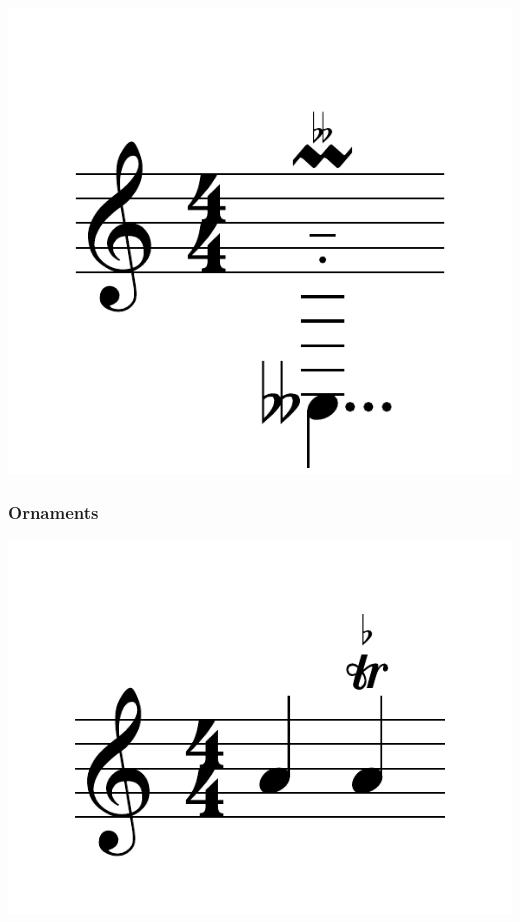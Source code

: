 \documentclass{article}
\begin{document}
\includegraphics[scale=0.5]{figures_tests/pdf/skern/notesFullAdds.pdf}

\subsubsection{Ornaments}
\includegraphics[scale=0.5]{figures_tests/pdf/skern/ornaments0.pdf}
\end{document}
